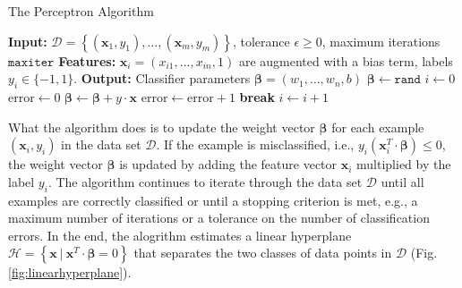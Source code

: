 \documentclass{article}[12pt]
\begin{document}
\begin{algorithm}[H]
    \caption{The Perceptron Algorithm}\label{alg:perceptron}
    \begin{algorithmic}[1]
        \State \textbf{Input:} $\mathcal{D} = \left\{(\mathbf{x}_{1},y_{1}),\dotsc,(\mathbf{x}_{m},y_{m})\right\}$, tolerance $\epsilon\geq{0}$, maximum iterations $\texttt{maxiter}$
        \State \textbf{Features:} $\mathbf{x}_{i} = \left(x_{i1},\dots, x_{in},1\right)$ are augmented with a bias term, labels $y_{i}\in\{-1,1\}$.
        \State \textbf{Output:} Classifier parameters $\mathbf{\beta} = \left(w_{1},\dots, w_{n}, b\right)$
        \State $\mathbf{\beta} \gets \texttt{rand}$
        \State $i \gets 0$
        \State $\text{error} \gets 0$
                \State $\mathbf{\beta} \gets \mathbf{\beta} + {y}\cdot\mathbf{x}$
                \State $\text{error} \gets \text{error} + 1$
            \EndIf
        \EndFor
            \State \textbf{break}     
        \EndIf
        \State $i \gets i + 1$
        \EndWhile
    \end{algorithmic}
\end{algorithm}
What the algorithm does is to update the weight vector $\mathbf{\beta}$ for each example $(\mathbf{x}_{i},y_{i})$ in the data set $\mathcal{D}$.
If the example is misclassified, i.e., $y_{i}\left(\mathbf{x}_{i}^{T}\cdot\mathbf{\beta}\right)\leq{0}$, the weight vector $\mathbf{\beta}$ is updated by adding the feature vector $\mathbf{x}_{i}$ multiplied by the label $y_{i}$.
The algorithm continues to iterate through the data set $\mathcal{D}$ until all examples are correctly classified or until a stopping criterion is met, e.g., a maximum number of iterations or a tolerance on the number of classification errors.
In the end, the alogrithm estimates a linear hyperplane $\mathcal{H} = \left\{\mathbf{x}~|~\mathbf{x}^{T}\cdot\mathbf{\beta} = 0\right\}$ that separates the two classes of data points in $\mathcal{D}$ (Fig. \ref{fig:linearhyperplane}).
\end{document}
